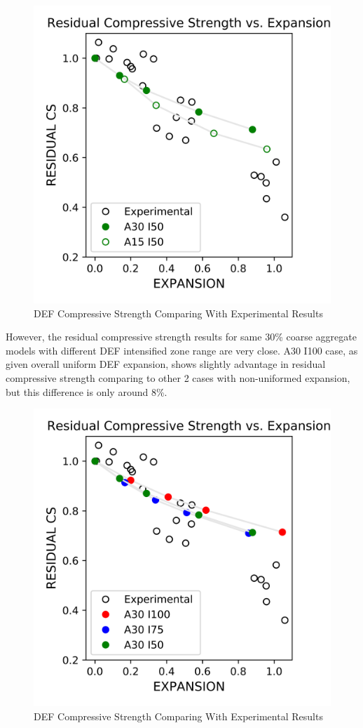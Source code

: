 \begin{figure}[ht!]
\centering
\includegraphics[width=.8\linewidth]{Files/CS_plot/DEFCS2.png}
  \caption{DEF Compressive Strength Comparing With Experimental Results}
  \label{DEFA30vsA15}
\end{figure}

However, the residual compressive strength results for same 30\% coarse aggregate models with different DEF intensified zone range are very close. A30 I100 case, as given overall uniform DEF expansion, shows slightly advantage in residual compressive strength comparing to other 2 cases with non-uniformed expansion, but this difference is only around 8\%.

\begin{figure}[ht!]
\centering
\includegraphics[width=.8\linewidth]{Files/CS_plot/DEFCS3.png}
  \caption{DEF Compressive Strength Comparing With Experimental Results}
  \label{DEF_X}
\end{figure}

